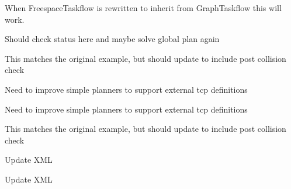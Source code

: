 
\begin{DoxyRefList}
\item[Member \mbox{\hyperlink{taskflow__profiling__example_8cpp_ae66f6b31b5ad750f1fe042a706a4e3d4}{main}} ()]\label{todo__todo000038}%
%
When Freespace\+Taskflow is rewritten to inherit from Graph\+Taskflow this will work.  
\item[Member \mbox{\hyperlink{classtesseract__examples_1_1OnlinePlanningExample_a354985cdbaa511e24b5c010271477fad}{tesseract\+\_\+examples\+::Online\+Planning\+Example\+::online\+Plan}} ()]\label{todo__todo000001}%
%
Should check status here and maybe solve global plan again  
\item[Member \mbox{\hyperlink{classtesseract__examples_1_1PuzzlePieceAuxillaryAxesExample_a80bdddfe2d2d8a0f57f18351acd706fc}{tesseract\+\_\+examples\+::Puzzle\+Piece\+Auxillary\+Axes\+Example\+::run}} () override final]\label{todo__todo000002}%
%
This matches the original example, but should update to include post collision check 

\label{todo__todo000003}%
%
Need to improve simple planners to support external tcp definitions  
\item[Member \mbox{\hyperlink{classtesseract__examples_1_1PuzzlePieceExample_ae060f91174e938a20c6cca4962009c03}{tesseract\+\_\+examples\+::Puzzle\+Piece\+Example\+::run}} () override final]\label{todo__todo000005}%
%
Need to improve simple planners to support external tcp definitions 

\label{todo__todo000004}%
%
This matches the original example, but should update to include post collision check  
\item[Member \mbox{\hyperlink{classtesseract__planning_1_1DescartesDefaultPlanProfile_a8bbf9dd170dfc5da44f4117d74ca7a6a}{tesseract\+\_\+planning\+::Descartes\+Default\+Plan\+Profile\texorpdfstring{$<$}{<} Float\+Type \texorpdfstring{$>$}{>}\+::Descartes\+Default\+Plan\+Profile}} (const tinyxml2\+::\+XMLElement \&xml\+\_\+element)]\label{todo__todo000011}%
%
Update XML 

\label{todo__todo000012}%
%
Update XML 


\end{DoxyRefList}
